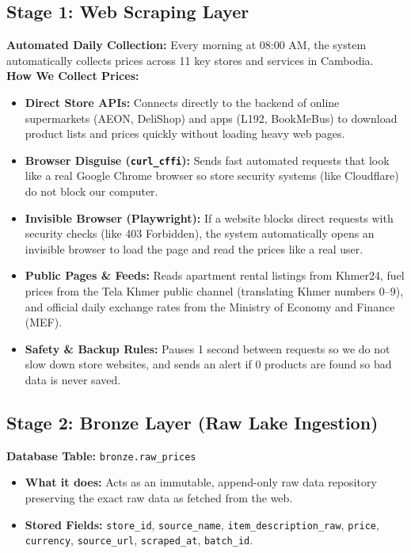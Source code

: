 \documentclass[10pt,a4paper]{article}
\begin{document}
\subsection*{Stage 1: Web Scraping Layer}
\noindent\textbf{Automated Daily Collection:} Every morning at 08:00 AM, the system automatically collects prices across 11 key stores and services in Cambodia.\\[0.1cm]
\noindent\textbf{How We Collect Prices:}
\begin{itemize}[noitemsep,topsep=1pt,leftmargin=*]
    \item \textbf{Direct Store APIs:} Connects directly to the backend of online supermarkets (AEON, DeliShop) and apps (L192, BookMeBus) to download product lists and prices quickly without loading heavy web pages.
    \item \textbf{Browser Disguise (\texttt{curl\_cffi}):} Sends fast automated requests that look like a real Google Chrome browser so store security systems (like Cloudflare) do not block our computer.
    \item \textbf{Invisible Browser (Playwright):} If a website blocks direct requests with security checks (like 403 Forbidden), the system automatically opens an invisible browser to load the page and read the prices like a real user.
    \item \textbf{Public Pages \& Feeds:} Reads apartment rental listings from Khmer24, fuel prices from the Tela Khmer public channel (translating Khmer numbers 0--9), and official daily exchange rates from the Ministry of Economy and Finance (MEF).
    \item \textbf{Safety \& Backup Rules:} Pauses 1 second between requests so we do not slow down store websites, and sends an alert if 0 products are found so bad data is never saved.
\end{itemize}

\subsection*{Stage 2: Bronze Layer (Raw Lake Ingestion)}
\noindent\textbf{Database Table:} \texttt{bronze.raw\_prices}
\begin{itemize}[noitemsep,topsep=1pt,leftmargin=*]
    \item \textbf{What it does:} Acts as an immutable, append-only raw data repository preserving the exact raw data as fetched from the web.
    \item \textbf{Stored Fields:} \texttt{store\_id}, \texttt{source\_name}, \texttt{item\_description\_raw}, \texttt{price}, \texttt{currency}, \texttt{source\_url}, \texttt{scraped\_at}, \texttt{batch\_id}.
\end{itemize}
\end{document}
